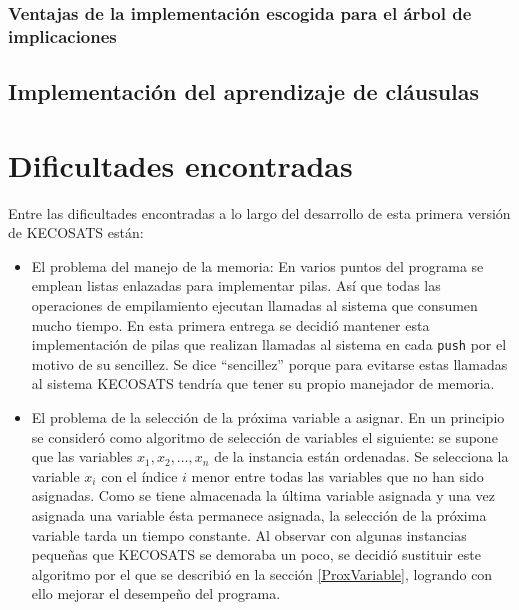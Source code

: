 \documentclass[12pt,lettersize,oneside]{article}
\begin{document}
\subsubsection{Ventajas de la implementación escogida para el árbol de implicaciones}


\subsection{Implementación del aprendizaje de cláusulas}
\newpage

\section{Dificultades encontradas}
Entre las dificultades encontradas a lo largo del desarrollo de esta primera
versión de KECOSATS están:
\begin{itemize}
\item El problema del manejo de la memoria: En varios puntos del programa se
  emplean listas enlazadas para implementar pilas. Así que todas las operaciones
  de empilamiento ejecutan llamadas al sistema que consumen mucho tiempo. En
  esta primera entrega se decidió mantener esta implementación de pilas que
  realizan llamadas al sistema en cada {\tt push} por el motivo de su
  sencillez. Se dice ``sencillez'' porque para evitarse estas llamadas al
  sistema KECOSATS tendría que tener su propio manejador de memoria.
\item El problema de la selección de la próxima variable a asignar. En un
  principio se consideró como algoritmo de selección de variables el siguiente:
  se supone que las variables $x_1,x_2,\ldots,x_n$ de la instancia están
  ordenadas. Se selecciona la variable $x_i$ con el índice $i$ menor entre todas
  las variables que no han sido asignadas. Como se tiene almacenada la última
  variable asignada y una vez asignada una variable ésta permanece asignada, la
  selección de la próxima variable tarda un tiempo constante. Al observar con
  algunas instancias pequeñas que KECOSATS se demoraba un poco, se decidió
  sustituir este algoritmo por el que se describió en la sección
  \ref{ProxVariable}, logrando con ello mejorar el desempeño del programa.
\end{itemize}
\end{document}
